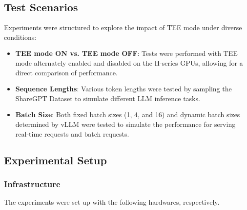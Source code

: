 \documentclass{article}
\begin{document}
\subsection{Test Scenarios}

Experiments were structured to explore the impact of TEE mode under diverse conditions:
\begin{itemize}
    \item \textbf{TEE mode ON vs. TEE mode OFF}: Tests were performed with TEE mode alternately enabled and disabled on the H-series GPUs, allowing for a direct comparison of performance.
    \item \textbf{Sequence Lengths}: Various token lengths were tested by sampling the ShareGPT Dataset \cite{sharegpt} to simulate different LLM inference tasks.
    \item \textbf{Batch Size}: Both fixed batch sizes (1, 4, and 16) and dynamic batch sizes determined by vLLM \cite{kwon2023efficient} were tested to simulate the performance for serving real-time requests and batch requests.
\end{itemize}

\subsection{Experimental Setup}

\subsubsection{Infrastructure}

The experiments were set up with the following hardwares, respectively.
\end{document}
